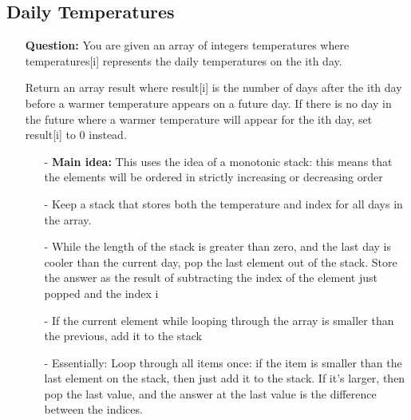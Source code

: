 \documentclass[12pt]{article}
\begin{document}
\subsection{Daily Temperatures}
\begin{enumerate}
  \item[] \textbf{Question:} You are given an array of integers temperatures where temperatures[i] represents the daily temperatures on the ith day.

Return an array result where result[i] is the number of days after the ith day before a warmer temperature appears on a future day. If there is no day in the future where a warmer temperature will appear for the ith day, set result[i] to 0 instead.

    \begin{enumerate}
      \item[-] \textbf{Main idea:} This uses the idea of a monotonic stack: this means that the elements will be ordered in strictly increasing or decreasing order
      \item[-] Keep a stack that stores both the temperature and index for all days in the array.
      \item[-] While the length of the stack is greater than zero, and the last day is cooler than the current day, pop the last element out of the stack. Store the answer as the result of subtracting the index of the element just popped and the index i
      \item[-] If the current element while looping through the array is smaller than the previous, add it to the stack
      \item[-] Essentially: Loop through all items once: if the item is smaller than the last element on the stack, then just add it to the stack. If it's larger, then pop the last value, and the answer at the last value is the difference between the indices.

    \end{enumerate}
\end{enumerate}
\end{document}
